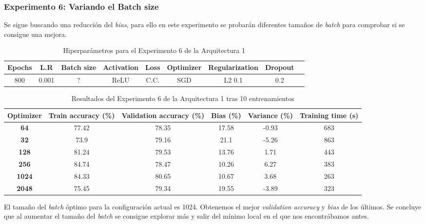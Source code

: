 \documentclass{article}
\begin{document}
   \subsubsection{Experimento 6: Variando el Batch size}

Se sigue buscando una reducci\'on del \textit{bias}, para ello en este experimento se probar\'an diferentes tama\~{n}os de \textit{batch} para comprobar si se consigue una mejora. 

    \begin{table}[!h]
				\begin{tabular}{|c|c|c|c|c|c|c|c|c|}
					\textbf{Epochs}&\textbf{L.R}&\textbf{Batch size}&\textbf{Activation}&\textbf{Loss}&\textbf{Optimizer}&\textbf{Regularization}&\textbf{Dropout}   \\ \hline
					800 & 0.001 & ?& ReLU & C.C. & SGD & L2 0.1 & 0.2 
				\end{tabular}
				\caption{Hiperpar\'ametros para el Experimento 6 de la Arquitectura 1}
				\label{tab:hip-a6-e6}
			\end{table}

    
   
   \begin{table}[!h]
				\begin{center}
					\begin{tabular}{ c | c | c | c | c | c |}
						 \textbf{Optimizer} & \textbf{Train accuracy (\%)} & \textbf{Validation accuracy (\%)} & \textbf{Bias (\%)} & \textbf{Variance (\%)} & \textbf{Training time (s)} \\ \hline
	
                        \textbf{64} &  77.42   &  78.35& 17.58 & -0.93 &   683  \\ \hline
                        \textbf{32} &  73.9    & 79.16& 21.1 & -5.26 &   863  \\ \hline
                        \textbf{128} &  81.24  &  79.53& 13.76 &  1.71  &   443   \\ \hline
                        \textbf{256} &  84.74 &  78.47 & 10.26 & 6.27 &   383    \\ \hline
                        \textbf{1024} & 84.33 &  80.65 & 10.67 & 3.68 &   263     \\ \hline
                        \textbf{2048} & 75.45 &  79.34 & 19.55  & -3.89 &   323      \\ \hline
					\end{tabular}
					\caption{Resultados del Experimento 6 de la Arquitectura 1 tras 10 entrenamientos}
					\label{tab:res-a2-e6}
				\end{center}
			\end{table}
   El tama\~{n}o del \textit{batch} \'optimo para la configuraci\'on actual es 1024. Obtenemos el mejor \textit{validation accuracy} y \textit{bias} de los \'ultimos. Se concluye que al aumentar el tama\~{n}o del \textit{batch} se consigue explorar m\'as y salir del m\'inimo local en el que nos encontr\'abamos antes. 
\end{document}
